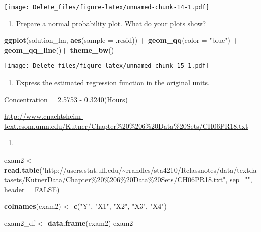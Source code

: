 \documentclass[
]{article}
\newenvironment{Shaded}{\begin{snugshade}}{\end{snugshade}}
\newcommand{\AttributeTok}[1]{\textcolor[rgb]{0.13,0.29,0.53}{#1}}
\newcommand{\ConstantTok}[1]{\textcolor[rgb]{0.56,0.35,0.01}{#1}}
\newcommand{\FunctionTok}[1]{\textcolor[rgb]{0.13,0.29,0.53}{\textbf{#1}}}
\newcommand{\NormalTok}[1]{#1}
\newcommand{\OtherTok}[1]{\textcolor[rgb]{0.56,0.35,0.01}{#1}}
\newcommand{\SpecialCharTok}[1]{\textcolor[rgb]{0.81,0.36,0.00}{\textbf{#1}}}
\newcommand{\StringTok}[1]{\textcolor[rgb]{0.31,0.60,0.02}{#1}}
\providecommand{\tightlist}{%
  \setlength{\itemsep}{0pt}\setlength{\parskip}{0pt}}
\begin{document}
\texttt{[image: Delete\_files/figure-latex/unnamed-chunk-14-1.pdf]}

\begin{enumerate}
\def\labelenumi{(\alph{enumi})}
\setcounter{enumi}{6}
\tightlist
\item
  Prepare a normal probability plot. What do your plots show?
\end{enumerate}

\begin{Shaded}
\begin{Highlighting}[]
\FunctionTok{ggplot}\NormalTok{(solution\_lm, }\FunctionTok{aes}\NormalTok{(}\AttributeTok{sample =}\NormalTok{ .resid)) }\SpecialCharTok{+} \FunctionTok{geom\_qq}\NormalTok{(}\AttributeTok{color =} \StringTok{"blue"}\NormalTok{) }\SpecialCharTok{+} \FunctionTok{geom\_qq\_line}\NormalTok{()}\SpecialCharTok{+} \FunctionTok{theme\_bw}\NormalTok{()}
\end{Highlighting}
\end{Shaded}

\texttt{[image: Delete\_files/figure-latex/unnamed-chunk-15-1.pdf]}

\begin{enumerate}
\def\labelenumi{(\alph{enumi})}
\setcounter{enumi}{7}
\tightlist
\item
  Express the estimated regression function in the original units.
\end{enumerate}

Concentration = 2.5753 - 0.3240(Hours)

\url{http://www.cnachtsheim-text.csom.umn.edu/Kutner/Chapter\%20\%206\%20Data\%20Sets/CH06PR18.txt}

\begin{enumerate}
\def\labelenumi{\arabic{enumi})}
\setcounter{enumi}{3}
\tightlist
\item
\end{enumerate}

\begin{Shaded}
\begin{Highlighting}[]
\NormalTok{exam2 }\OtherTok{\textless{}{-}} \FunctionTok{read.table}\NormalTok{(}\StringTok{"http://users.stat.ufl.edu/\textasciitilde{}rrandles/sta4210/Rclassnotes/data/textdatasets/KutnerData/Chapter\%20\%206\%20Data\%20Sets/CH06PR18.txt"}\NormalTok{, }\AttributeTok{sep=}\StringTok{""}\NormalTok{, }\AttributeTok{header =} \ConstantTok{FALSE}\NormalTok{)}

\FunctionTok{colnames}\NormalTok{(exam2) }\OtherTok{\textless{}{-}} \FunctionTok{c}\NormalTok{(}\StringTok{"Y"}\NormalTok{, }\StringTok{"X1"}\NormalTok{, }\StringTok{"X2"}\NormalTok{, }\StringTok{"X3"}\NormalTok{, }\StringTok{"X4"}\NormalTok{)}

\NormalTok{exam2\_df }\OtherTok{\textless{}{-}} \FunctionTok{data.frame}\NormalTok{(exam2)}
\NormalTok{exam2}
\end{Highlighting}
\end{Shaded}
\end{document}
